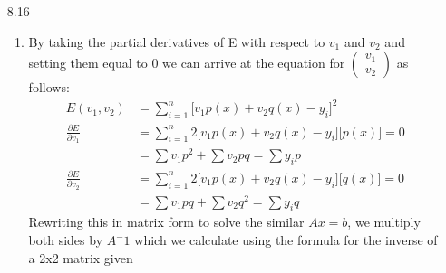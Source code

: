 \documentclass[11pt,a4paper]{article}
\begin{document}
\begin{itemize}
\begin{enumerate} [label={\alph*)}]
					\item Continuing from part c, calculating the partial derivative of $E$ with respect to $v_2$ turns out to be very difficult. We reduce it to:
					\begin{align*}
						E(v_1,v_2) &= \sum\limits_{i=1}^n \Big[v_1x_i^{v_2}-y_i\Big]^2 \\
						\frac{\partial E}{\partial v_2} &= \sum\limits_{i=1}^n 2\Big[v_1x_i^{v_2}-y_i\Big]\Big[\frac{\partial}{\partial v_2}\Big] = 0 
					\end{align*}
					Seeing as how $v_2$ is currently an exponent, solving using Newton's method would require us to solve full form the derivative (which would be a messy exercise, whereas the secant method allows us a means to approximate the derivative which in our case is extremely useful. This has broader applications in that it is likely often very difficult in practice to calculate derivatives and highlights why newer machine learning libraries are beginning to feature automatic differentiation.
				\end{enumerate}
			\item[8.16]
				\begin{enumerate} [label={\alph*)}]
					\item By taking the partial derivatives of E with respect to $v_1$ and $v_2$ and setting them equal to 0 we can arrive at the equation for $\begin{pmatrix} v_1 \\ v_2 \end{pmatrix}$ as follows:
					\begin{align*}
						E(v_1,v_2) &= \sum\limits_{i=1}^n \Big[v_1p(x) + v_2q(x) - y_i\Big]^2 \\
						\frac{\partial E}{\partial v_1} &= \sum\limits_{i=1}^n 2\Big[v_1p(x) + v_2q(x) - y_i\Big]\Big[p(x)\Big] = 0 \\
						&= \displaystyle \sum v_1p^2 + \displaystyle \sum v_2 pq = \displaystyle \sum y_i p \\
						\frac{\partial E}{\partial v_2} &= \sum\limits_{i=1}^n 2\Big[v_1p(x) + v_2q(x) - y_i\Big]\Big[q(x)\Big] = 0 \\
						&= \displaystyle \sum v_1pq + \displaystyle \sum v_2 q^2 = \displaystyle \sum y_i q
					\end{align*}
					Rewriting this in matrix form to solve the similar $Ax=b$, we multiply both sides by $A^-1$ which we calculate using the formula for the inverse of a 2x2 matrix given
					\begin{align*}

\end{align*}
\end{enumerate}
\end{itemize}
\end{document}
